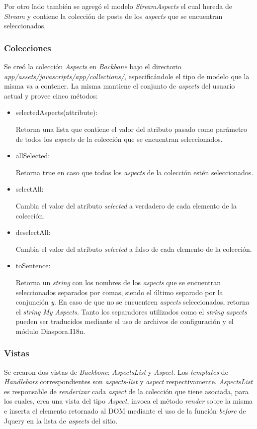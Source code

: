 Por otro lado también se agregó el modelo \emph{StreamAspects} el cual hereda de \emph{Stream} y contiene la colección de posts de los \emph{aspects} que se encuentran
seleccionados.

\subsubsection{Colecciones}

Se creó la colección \emph{Aspects} en \emph{Backbone} bajo el directorio\\ 
\emph{app/assets/javascripts/app/collections/}, especificándole el tipo de modelo que la misma va a contener. La
misma mantiene el conjunto de \emph{aspects} del usuario actual y  provee cinco métodos:

\begin{itemize}
\item{selectedAspects(attribute):}

Retorna una lista que contiene el valor del atributo pasado como parámetro de todos los \emph{aspects} de la colección que se encuentran seleccionados.
\item{allSelected:}

Retorna true en caso que todos los \emph{aspects} de la colección estén seleccionados.
\item{selectAll:}

Cambia el valor del atributo \emph{selected} a verdadero de cada elemento de la colección.
\item{deselectAll:}

Cambia el valor del atributo \emph{selected} a falso de cada elemento de la colección.
\item{toSentence:}

Retorna un \emph{string} con los nombres de los \emph{aspects} que se encuentran seleccionados separados por comas, siendo el último separado por la conjunción \emph{y}. En
caso de que no se encuentren \emph{aspects} seleccionados, retorna el \emph{string} \emph{My Aspects}. Tanto los separadores utilizados como el \emph{string} \emph{aspects}
pueden ser traducidos mediante el uso de archivos de configuración y el módulo Diaspora.I18n.
\end{itemize}

\subsubsection{Vistas}

Se crearon dos vistas de \emph{Backbone}: \emph{AspectsList} y \emph{Aspect}. Los \emph{templates} de \emph{Handlebars} correspondientes son \emph{aspects-list} y
\emph{aspect} respectivamente. \emph{AspectsList} es responsable de \emph{renderizar} cada \emph{aspect} de la colección que tiene asociada, para los cuales, crea una vista del
tipo \emph{Aspect}, invoca el método \emph{render} sobre la misma e inserta el elemento retornado al DOM mediante el uso de la función \emph{before} de Jquery en la lista de
\emph{aspects} del sitio. 

